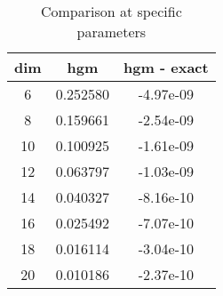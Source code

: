 \begin{table}[htbp]
\begin{center}
\begin{tabular}{ccc}
dim & hgm & hgm - exact\\
\hline
 6 & 0.252580 & -4.97e-09\\
 8 & 0.159661 & -2.54e-09\\
10 & 0.100925 & -1.61e-09\\
12 & 0.063797 & -1.03e-09\\
14 & 0.040327 & -8.16e-10\\
16 & 0.025492 & -7.07e-10\\
18 & 0.016114 & -3.04e-10\\
20 & 0.010186 & -2.37e-10\\
\hline
\end{tabular}
\end{center}
\caption{Comparison at specific parameters}
\label{tab:feller}
\end{table}
